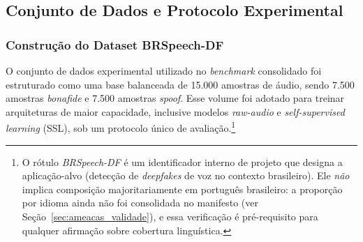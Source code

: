 \documentclass[12pt,a4paper]{article}
\begin{document}
\subsection{Conjunto de Dados e Protocolo Experimental}
\label{sec:dataset_protocolo}

\subsubsection{Construção do Dataset BRSpeech-DF}
\label{sec:brspeech_df}

O conjunto de dados experimental utilizado no \textit{benchmark} consolidado
foi estruturado como uma base balanceada de 15.000 amostras de áudio, sendo
7.500 amostras \textit{bonafide} e 7.500 amostras \textit{spoof}. Esse volume
foi adotado para treinar arquiteturas de maior capacidade, inclusive modelos
\textit{raw-audio} e \textit{self-supervised learning} (SSL), sob um protocolo
único de avaliação.\footnote{O rótulo \textit{BRSpeech-DF} é um identificador
interno de projeto que designa a aplicação-alvo (detecção de \textit{deepfakes}
de voz no contexto brasileiro). Ele \emph{não} implica composição
majoritariamente em português brasileiro: a proporção por idioma ainda não foi
consolidada no manifesto (ver Seção~\ref{sec:ameacas_validade}), e essa
verificação é pré-requisito para qualquer afirmação sobre cobertura
linguística.}
\end{document}
